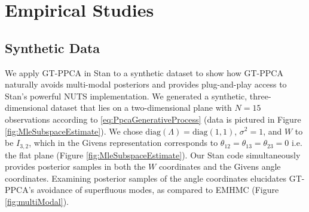\documentclass{article}
\begin{document}
\section{Empirical Studies} \label{examples}

\subsection{Synthetic Data}
We apply GT-PPCA in Stan to a synthetic dataset to show how GT-PPCA naturally avoids multi-modal posteriors and provides plug-and-play access to Stan's powerful NUTS implementation. We generated a synthetic, three-dimensional dataset that lies on a two-dimensional plane with $N =15$ observations according to \ref{eq:PpcaGenerativeProcess} (data is pictured in Figure \ref{fig:MleSubspaceEstimate}). We chose $\mathrm{diag}(\Lambda) =\mathrm{diag}(1, 1)$, $\sigma^2 = 1$, and $W$ to be $I_{3,2}$, which in the Givens representation corresponds to $\theta_{12} = \theta_{13} = \theta_{23} = 0$ i.e. the flat plane (Figure \ref{fig:MleSubspaceEstimate}). Our Stan code simultaneously provides posterior samples in both the $W$ coordinates and the Givens angle coordinates. Examining posterior samples of the angle coordinates elucidates GT-PPCA's avoidance of superfluous modes, as compared to EMHMC (Figure \ref{fig:multiModal}).
\end{document}
